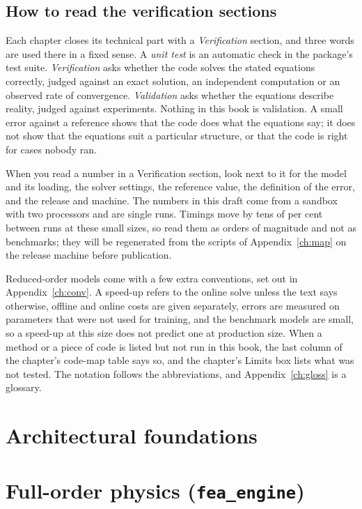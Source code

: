 \documentclass[11pt,a4paper,twoside,openany]{book}
\begin{document}
\chapter*{How to read the verification sections}
Each chapter closes its technical part with a \emph{Verification} section, and three words are used there in a fixed sense. A \emph{unit test} is an automatic check in the package's test suite. \emph{Verification} asks whether the code solves the stated equations correctly, judged against an exact solution, an independent computation or an observed rate of convergence. \emph{Validation} asks whether the equations describe reality, judged against experiments. Nothing in this book is validation. A small error against a reference shows that the code does what the equations say; it does not show that the equations suit a particular structure, or that the code is right for cases nobody ran.

When you read a number in a Verification section, look next to it for the model and its loading, the solver settings, the reference value, the definition of the error, and the release and machine. The numbers in this draft come from a sandbox with two processors and are single runs. Timings move by tens of per cent between runs at these small sizes, so read them as orders of magnitude and not as benchmarks; they will be regenerated from the scripts of Appendix~\ref{ch:map} on the release machine before publication.

Reduced-order models come with a few extra conventions, set out in Appendix~\ref{ch:conv}. A speed-up refers to the online solve unless the text says otherwise, offline and online costs are given separately, errors are measured on parameters that were not used for training, and the benchmark models are small, so a speed-up at this size does not predict one at production size. When a method or a piece of code is listed but not run in this book, the last column of the chapter's code-map table says so, and the chapter's Limits box lists what was not tested. The notation follows the abbreviations, and Appendix~\ref{ch:gloss} is a glossary.


\tableofcontents
\listoffigures
\listoftables

\mainmatter
\part{Architectural foundations}


\part{Full-order physics (\texttt{fea\_engine})}





\end{document}
